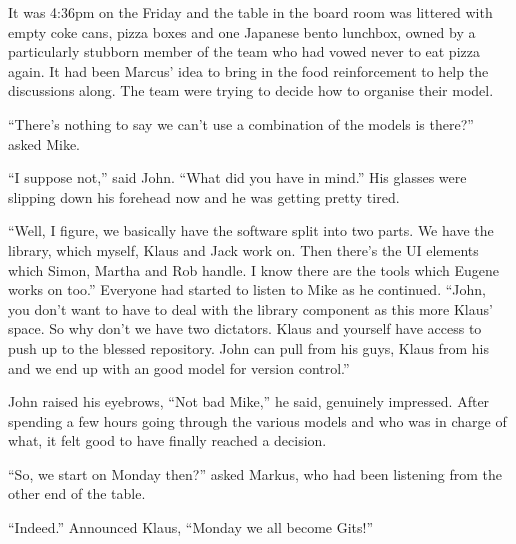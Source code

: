 \begin{trenches}
It was 4:36pm on the Friday and the table in the board room was littered with empty coke cans, pizza boxes and one Japanese bento lunchbox, owned by a particularly stubborn member of the team who had vowed never to eat pizza again.
It had been Marcus' idea to bring in the food reinforcement to help the discussions along.
The team were trying to decide how to organise their model.

``There's nothing to say we can't use a combination of the models is there?'' asked Mike.

``I suppose not,'' said John.
``What did you have in mind.'' His glasses were slipping down his forehead now and he was getting pretty tired.

``Well, I figure, we basically have the software split into two parts. We have the library, which myself, Klaus and Jack work on. Then there's the UI elements which Simon, Martha and Rob handle. I know there are the tools which Eugene works on too.''
Everyone had started to listen to Mike as he continued.
``John, you don't want to have to deal with the library component as this more Klaus' space. So why don't we have two dictators. Klaus and yourself have access to push up to the blessed repository. John can pull from his guys, Klaus from his and we end up with an good model for version control.''

John raised his eyebrows, ``Not bad Mike,'' he said, genuinely impressed.
After spending a few hours going through the various models and who was in charge of what, it felt good to have finally reached a decision.

``So, we start on Monday then?'' asked Markus, who had been listening from the other end of the table.

``Indeed.'' Announced Klaus, ``Monday we all become Gits!''
\end{trenches}
